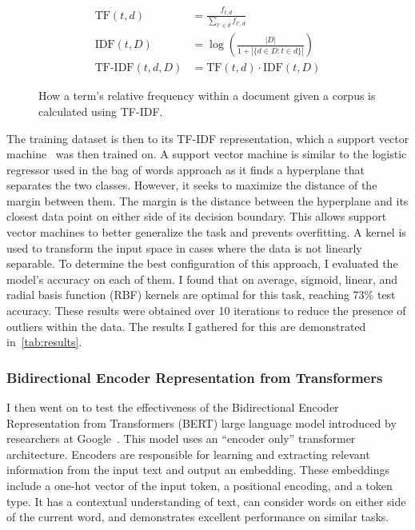 \documentclass[twocolumn]{article}
\begin{document}
\begin{figure}
    \begin{align*}
        \text{TF}(t, d) &= \frac{f_{t, d}}{\sum_{t' \in d}f_{t',d}} \\ 
        \text{IDF}(t, D) &= \log \left( \frac{|D|}{1 + |\{d \in D : t \in d\}|} \right) \\ 
        \text{TF-IDF}(t, d, D) &= \text{TF}(t, d) \cdot \text{IDF}(t, D) 
    \end{align*}
    \caption{How a term's relative frequency within a document given a corpus is calculated using TF-IDF.}
    \label{eq:tfidf}
\end{figure}

The training dataset is then to its TF-IDF representation, which a support vector machine~\cite{suthaharan2015chapter7} was then trained on. A support vector machine is similar to the logistic regressor used in the bag of words approach as it finds a hyperplane that separates the two classes. However, it seeks to maximize the distance of the margin between them. The margin is the distance between the hyperplane and its closest data point on either side of its decision boundary. This allows support vector machines to better generalize the task and prevents overfitting. A kernel is used to transform the input space in cases where the data is not linearly separable. To determine the best configuration of this approach, I evaluated the model's accuracy on each of them. I found that on average, sigmoid, linear, and radial basis function (RBF) kernels are optimal for this task, reaching 73\% test accuracy. These results were obtained over 10 iterations to reduce the presence of outliers within the data. The results I gathered for this are demonstrated in~\autoref{tab:results}.


\subsubsection{Bidirectional Encoder Representation from Transformers}

I then went on to test the effectiveness of the Bidirectional Encoder Representation from Transformers (BERT) large language model introduced by researchers at Google~\cite{devlin2018bert}. This model uses an ``encoder only'' transformer architecture. Encoders are responsible for learning and extracting relevant information from the input text and output an embedding. These embeddings include a one-hot vector of the input token, a positional encoding, and a token type. It has a contextual understanding of text, can consider words on either side of the current word, and demonstrates excellent performance on similar tasks. 
\end{document}
